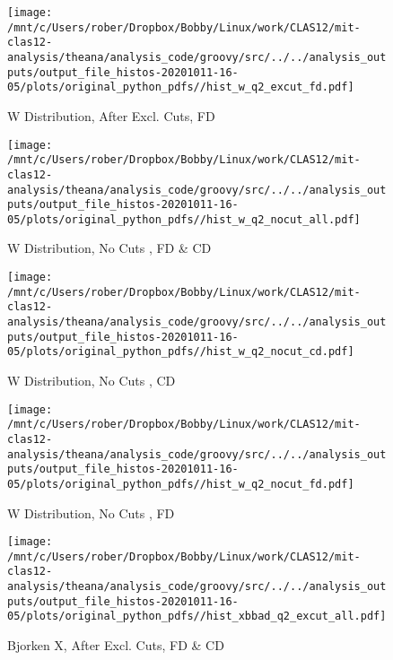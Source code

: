\documentclass{article}
\begin{document}
\begin{landscape}
    \begin{figure}[h]
        \centering

        \texttt{[image: /mnt/c/Users/rober/Dropbox/Bobby/Linux/work/CLAS12/mit-clas12-analysis/theana/analysis\_code/groovy/src/../../analysis\_outputs/output\_file\_histos-20201011-16-05/plots/original\_python\_pdfs//hist\_w\_q2\_excut\_fd.pdf]}
        \captionsetup{textformat=empty,labelformat=blank}
        \caption{W Distribution, After Excl. Cuts, FD}
    \end{figure}
    \clearpage
    
    \begin{figure}[h]
        \centering

        \texttt{[image: /mnt/c/Users/rober/Dropbox/Bobby/Linux/work/CLAS12/mit-clas12-analysis/theana/analysis\_code/groovy/src/../../analysis\_outputs/output\_file\_histos-20201011-16-05/plots/original\_python\_pdfs//hist\_w\_q2\_nocut\_all.pdf]}
        \captionsetup{textformat=empty,labelformat=blank}
        \caption{W Distribution, No Cuts , FD \& CD}
    \end{figure}
    \clearpage
    
    \begin{figure}[h]
        \centering

        \texttt{[image: /mnt/c/Users/rober/Dropbox/Bobby/Linux/work/CLAS12/mit-clas12-analysis/theana/analysis\_code/groovy/src/../../analysis\_outputs/output\_file\_histos-20201011-16-05/plots/original\_python\_pdfs//hist\_w\_q2\_nocut\_cd.pdf]}
        \captionsetup{textformat=empty,labelformat=blank}
        \caption{W Distribution, No Cuts , CD}
    \end{figure}
    \clearpage
    
    \begin{figure}[h]
        \centering

        \texttt{[image: /mnt/c/Users/rober/Dropbox/Bobby/Linux/work/CLAS12/mit-clas12-analysis/theana/analysis\_code/groovy/src/../../analysis\_outputs/output\_file\_histos-20201011-16-05/plots/original\_python\_pdfs//hist\_w\_q2\_nocut\_fd.pdf]}
        \captionsetup{textformat=empty,labelformat=blank}
        \caption{W Distribution, No Cuts , FD}
    \end{figure}
    \clearpage
    
    \begin{figure}[h]
        \centering

        \texttt{[image: /mnt/c/Users/rober/Dropbox/Bobby/Linux/work/CLAS12/mit-clas12-analysis/theana/analysis\_code/groovy/src/../../analysis\_outputs/output\_file\_histos-20201011-16-05/plots/original\_python\_pdfs//hist\_xbbad\_q2\_excut\_all.pdf]}
        \captionsetup{textformat=empty,labelformat=blank}
        \caption{Bjorken X, After Excl. Cuts, FD \& CD}
    \end{figure}
    \clearpage
    

\end{landscape}
\end{document}

